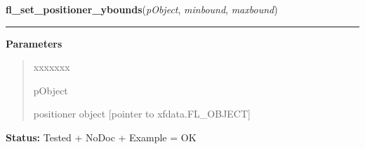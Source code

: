 \hspace{.8\funcindent}\begin{boxedminipage}{\funcwidth}

    \raggedright \textbf{fl\_set\_positioner\_ybounds}(\textit{pObject}, \textit{minbound}, \textit{maxbound})

    \vspace{-1.5ex}

    \rule{\textwidth}{0.5\fboxrule}
\setlength{\parskip}{2ex}
\setlength{\parskip}{1ex}
      \textbf{Parameters}
      \vspace{-1ex}

      \begin{quote}
        \begin{Ventry}{xxxxxxx}

          \item[pObject]

          positioner object [pointer to xfdata.FL\_OBJECT]

        \end{Ventry}

      \end{quote}

\textbf{Status:} Tested + NoDoc + Example = OK



    \end{boxedminipage}

    \label{xformslib:library:fl_get_positioner_ybounds}

    \vspace{0.5ex}

